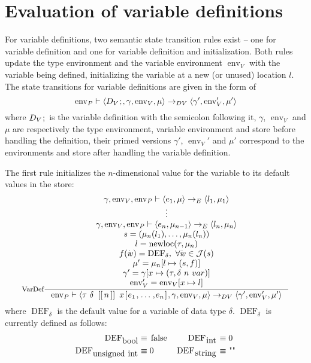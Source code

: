 \documentclass[a4paper, 10pt, draft]{report}
\DeclareMathOperator*{\env}{env}
\DeclareMathOperator*{\newloc}{newloc}
\newcommand{\mycode}[1]{\ensuremath{\mbox{\lstinline{#1}}}}
\begin{document}
\section{Evaluation of variable definitions}\label{sec:semantics:expr:vardefs}

For variable definitions, two semantic state transition rules exist -- one for
variable definition and one for variable definition and initialization. Both
rules update the type environment and the variable environment
$\operatorname{env}_V$ with the variable being defined, initializing the
variable at a new (or unused) location $l$. The state transitions for variable
definitions are given in the form of
\[
  \operatorname{env}_P |- \left\langle
    D_V\mycode{;},
    \gamma,
    \operatorname{env}_V,
    \mu
  \right\rangle ->_{DV} \left\langle
    \gamma',
    \operatorname{env}_V',
    \mu'
  \right\rangle
\]
where $D_V\mycode{;}$ is the variable definition with the semicolon following
it, $\gamma$, $\operatorname{env}_V$ and $\mu$ are respectively the type
environment, variable environment and store before handling the definition,
their primed versions $\gamma'$, $\operatorname{env}_V'$ and $\mu'$ correspond
to the environments and store after handling the variable definition.

The first rule initializes the $n$-dimensional value for the variable to its
default values in the store:
\[ \inference[VarDef]{
  \gamma, \env_V, \env_P |- \left<e_1, \mu \right> \to_E \left< l_1, \mu_1\right> \\
  \vdots \\
  \gamma, \env_V, \env_P |- \left<e_n, \mu_{n-1} \right> \to_E \left< l_n, \mu_n\right> \\
  s = (\mu_n(l_1), \ldots,  \mu_n(l_n)) \\
  l = \newloc(\tau, \mu_n) \\
  f(i\!v) = \operatorname{DEF}_{\delta},\ \forall i\!v \in \mathcal{J}(s) \\
  \mu' = \mu_n[l \mapsto (s, f)] \\
  \gamma' = \gamma[x \mapsto (\tau, \delta\ n\ var)] \\
  \env'_V = \env_V[x \mapsto l] \\
}{
  \env_P |- \left<\tau\ \delta\ \mycode{[[}n\mycode{]]}\ x\mycode{[}e_1\mycode{,}\ldots\mycode{,}e_n\mycode{]}, \gamma, \env_V, \mu \right> \to_{DV}
            \left< \gamma', \env'_V, \mu' \right>
} \]
where $\operatorname{DEF}_{\delta}$ is the default value for a variable of data type $\delta$. $\operatorname{DEF}_{\delta}$ is currently defined as follows:
\begin{align*}
  \operatorname{DEF}_{\mycode{bool}} & \equiv \mycode{false}  &
  \operatorname{DEF}_{\mycode{int}} & \equiv \mycode{0} \\
  \operatorname{DEF}_{\mycode{unsigned int}} & \equiv \mycode{0} &
  \operatorname{DEF}_{\mycode{string}} & \equiv \mycode{\"\"}
\end{align*}
\end{document}
